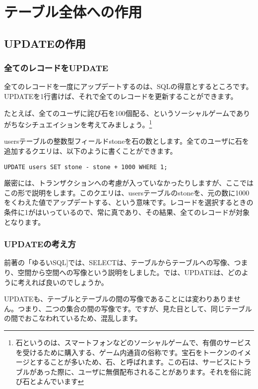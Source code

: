 \chapter{テーブル全体への作用}

\section{UPDATEの作用}

\subsection{全てのレコードをUPDATE}
全てのレコードを一度にアップデートするのは、SQLの得意とするところです。UPDATEを1行書けば、それで全てのレコードを更新することができます。

たとえば、全てのユーザに詫び石を100個配る、というソーシャルゲームでありがちなシチュエイションを考えてみましょう。\footnote{石というのは、スマートフォンなどのソーシャルゲームで、有償のサービスを受けるために購入する、ゲーム内通貨の俗称です。宝石をトークンのイメージとすることが多いため、石、と呼ばれます。この石は、サービスにトラブルがあった際に、ユーザに無償配布されることがあります。それを俗に詫び石とよんでいます}

usersテーブルの整数型フィールドstoneを石の数とします。全てのユーザに石を追加するクエリは、以下のように書くことができます。

\begin{verbatim}
UPDATE users SET stone - stone + 1000 WHERE 1;
\end{verbatim}

厳密には、トランザクションへの考慮が入っていなかったりしますが、ここではこの形で説明をします。このクエリは、usersテーブルのstoneを、元の数に1000をくわえた値でアップデートする、という意味です。レコードを選択するときの条件に1がはいっているので、常に真であり、その結果、全てのレコードが対象となります。


\subsection{UPDATEの考え方}

前著の「ゆるいSQL]では、SELECTは、テーブルからテーブルへの写像、つまり、空間から空間への写像という説明をしました。では、UPDATEは、どのように考えれば良いのでしょうか。

UPDATEも、テーブルとテーブルの間の写像であることには変わりありません。つまり、二つの集合の間の写像です。ですが、見た目として、同じテーブルの間でおこなわれているため、混乱します。

